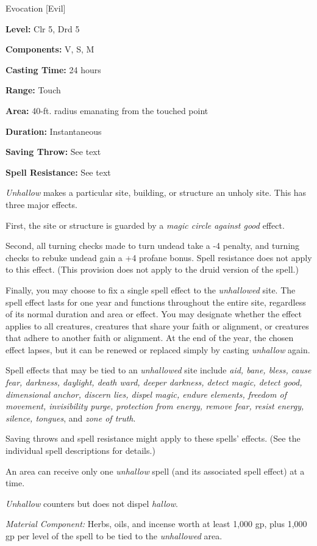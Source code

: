 
Evocation [Evil]

\textbf{Level:} Clr 5, Drd 5

\textbf{Components:} V, S, M

\textbf{Casting Time:} 24 hours

\textbf{Range:} Touch

\textbf{Area:} 40-ft. radius emanating from the touched point

\textbf{Duration:} Instantaneous

\textbf{Saving Throw:} See text

\textbf{Spell Resistance:} See text

\textit{Unhallow} makes a particular site, building, or structure an unholy site. 
This has three major effects.

First, the site or structure is guarded by a \textit{magic circle against good 
}effect.

Second, all turning checks made to turn undead take a -4 penalty, and turning checks 
to rebuke undead gain a +4 profane bonus. Spell resistance does not apply to this 
effect. (This provision does not apply to the druid version of the spell.)

Finally, you may choose to fix a single spell effect to the \textit{unhallowed 
}site. The spell effect lasts for one year and functions throughout the entire 
site, regardless of its normal duration and area or effect. You may designate whether 
the effect applies to all creatures, creatures that share your faith or alignment, 
or creatures that adhere to another faith or alignment. At the end of the year, 
the chosen effect lapses, but it can be renewed or replaced simply by casting \textit{unhallow 
}again.

Spell effects that may be tied to an \textit{unhallowed} site include \textit{aid, 
bane, bless, cause fear, darkness, daylight, death ward, deeper darkness, detect 
magic, detect good, dimensional anchor, discern lies, dispel magic, endure elements, 
freedom of movement, invisibility purge, protection from energy, remove fear, resist 
energy, silence, tongues}, and \textit{zone of truth}.

Saving throws and spell resistance might apply to these spells' effects. (See the 
individual spell descriptions for details.)

An area can receive only one \textit{unhallow} spell (and its associated spell 
effect) at a time.

\textit{Unhallow} counters but does not dispel \textit{hallow}.

\textit{Material Component:} Herbs, oils, and incense worth at least 1,000 gp, 
plus 1,000 gp per level of the spell to be tied to the \textit{unhallowed} area.

